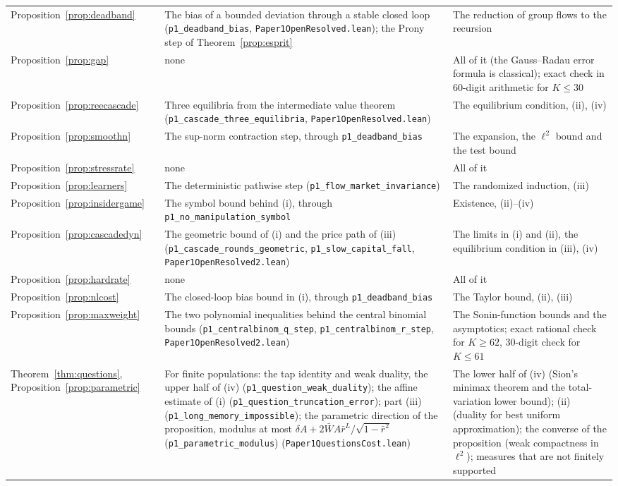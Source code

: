 \begin{longtable}{>{\raggedright\arraybackslash}p{}>{\raggedright\arraybackslash}p{}>{\raggedright\arraybackslash}p{}}
Proposition~\ref{prop:deadband} & The bias of a bounded deviation through a stable closed loop (\texttt{p1\_deadband\_bias}, \nolinkurl{Paper1OpenResolved.lean}); the Prony step of Theorem~\ref{prop:esprit} & The reduction of group flows to the recursion\\
Proposition~\ref{prop:gap} & none & All of it (the Gauss--Radau error formula is classical); exact check in 60-digit arithmetic for $K\le30$\\
Proposition~\ref{prop:reecascade} & Three equilibria from the intermediate value theorem (\texttt{p1\_cascade\_three\_equilibria}, \nolinkurl{Paper1OpenResolved.lean}) & The equilibrium condition, (ii), (iv)\\
Proposition~\ref{prop:smoothn} & The sup-norm contraction step, through \texttt{p1\_deadband\_bias} & The expansion, the $\ell^2$ bound and the test bound\\
Proposition~\ref{prop:stressrate} & none & All of it\\
Proposition~\ref{prop:learners} & The deterministic pathwise step (\texttt{p1\_flow\_market\_invariance}) & The randomized induction, (iii)\\
Proposition~\ref{prop:insidergame} & The symbol bound behind (i), through \texttt{p1\_no\_manipulation\_symbol} & Existence, (ii)--(iv)\\
Proposition~\ref{prop:cascadedyn} & The geometric bound of (i) and the price path of (iii) (\texttt{p1\_cascade\_rounds\_geometric}, \texttt{p1\_slow\_capital\_fall}, \nolinkurl{Paper1OpenResolved2.lean}) & The limits in (i) and (ii), the equilibrium condition in (iii), (iv)\\
Proposition~\ref{prop:hardrate} & none & All of it\\
Proposition~\ref{prop:nlcost} & The closed-loop bias bound in (i), through \texttt{p1\_deadband\_bias} & The Taylor bound, (ii), (iii)\\
Proposition~\ref{prop:maxweight} & The two polynomial inequalities behind the central binomial bounds (\texttt{p1\_centralbinom\_q\_step}, \texttt{p1\_centralbinom\_r\_step}, \nolinkurl{Paper1OpenResolved2.lean}) & The Sonin-function bounds and the asymptotics; exact rational check for $K\ge62$, 30-digit check for $K\le61$\\
Theorem~\ref{thm:questions}, Proposition~\ref{prop:parametric} & For finite populations: the tap identity and weak duality, the upper half of (iv) (\texttt{p1\_question\_weak\_duality}); the affine estimate of (i) (\texttt{p1\_question\_truncation\_error}); part (iii) (\texttt{p1\_long\_memory\_impossible}); the parametric direction of the proposition, modulus at most $\delta A+2\bar WA\bar r^L/\sqrt{1-\bar r^2}$ (\texttt{p1\_parametric\_modulus}) (\nolinkurl{Paper1QuestionsCost.lean}) & The lower half of (iv) (Sion's minimax theorem and the total-variation lower bound); (ii) (duality for best uniform approximation); the converse of the proposition (weak compactness in $\ell^2$); measures that are not finitely supported\\

\end{longtable}
